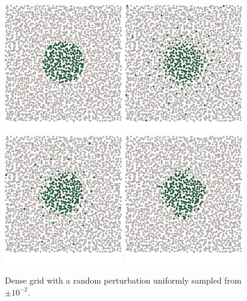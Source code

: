 \documentclass[review,supplement,onefignum,onetabnum]{siamonline220329}
\begin{document}
\begin{figure}[H]
  \centering
  \includegraphics{figures/precompiled/grid_1e-2/points_1.pdf}%
  \quad
  \includegraphics{figures/precompiled/grid_1e-2/points_2.pdf}%
  \quad
  \includegraphics{figures/precompiled/grid_1e-2/points_3.pdf}%
  \quad
  \includegraphics{figures/precompiled/grid_1e-2/points_4.pdf}%
  \caption{%
    Dense grid with a random perturbation
    uniformly sampled from \( \pm 10^{-2} \).
  }
\end{figure}
\end{document}

